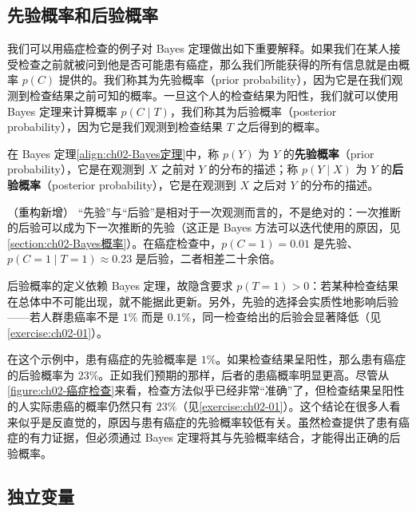 \documentclass[../../main.tex]{subfiles}
\begin{document}
\subsection{先验概率和后验概率}\label{subsection:ch02-先验概率和后验概率}

我们可以用癌症检查的例子对 Bayes 定理做出如下重要解释。如果我们在某人接受检查之前就被问到他是否可能患有癌症，那么我们所能获得的所有信息就是由概率 $p(C)$ 提供的。我们称其为先验概率（prior probability），因为它是在我们观测到检查结果之前可知的概率。一旦这个人的检查结果为阳性，我们就可以使用 Bayes 定理来计算概率 $p(C\mid T)$，我们称其为后验概率（posterior probability），因为它是我们观测到检查结果 $T$ 之后得到的概率。

\begin{definition}[先验概率与后验概率]\label{definition:ch02-先验后验}
在 Bayes 定理\eqref{align:ch02-Bayes定理}中，称 $p(Y)$ 为 $Y$ 的\textbf{先验概率}（prior probability），它是在观测到 $X$ 之前对 $Y$ 的分布的描述；称 $p(Y\mid X)$ 为 $Y$ 的\textbf{后验概率}（posterior probability），它是在观测到 $X$ 之后对 $Y$ 的分布的描述。
\end{definition}

\begin{remark}（重构新增）
“先验”与“后验”是相对于一次观测而言的，不是绝对的：一次推断的后验可以成为下一次推断的先验（这正是 Bayes 方法可以迭代使用的原因，见\cref{section:ch02-Bayes概率}）。在癌症检查中，$p(C=1)=0.01$ 是先验、$p(C=1\mid T=1)\approx0.23$ 是后验，二者相差二十余倍。

后验概率的定义依赖 Bayes 定理，故隐含要求 $p(T=1)>0$：若某种检查结果在总体中不可能出现，就不能据此更新。另外，先验的选择会实质性地影响后验——若人群患癌率不是 $1\%$ 而是 $0.1\%$，同一检查给出的后验会显著降低（见\cref{exercise:ch02-01}）。
\end{remark}

在这个示例中，患有癌症的先验概率是 $1\%$。如果检查结果呈阳性，那么患有癌症的后验概率为 $23\%$。正如我们预期的那样，后者的患癌概率明显更高。尽管从\cref{figure:ch02-癌症检查}来看，检查方法似乎已经非常“准确”了，但检查结果呈阳性的人实际患癌的概率仍然只有 $23\%$（见\cref{exercise:ch02-01}）。这个结论在很多人看来似乎是反直觉的，原因与患有癌症的先验概率较低有关。虽然检查提供了患有癌症的有力证据，但必须通过 Bayes 定理将其与先验概率结合，才能得出正确的后验概率。

\subsection{独立变量}\label{subsection:ch02-独立变量}
\end{document}
